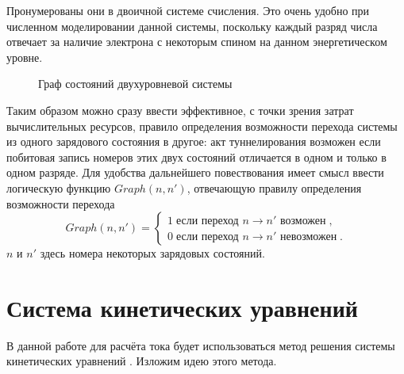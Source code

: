 \documentclass[12pt,a4paper]{report}
\begin{document}
Пронумерованы они в двоичной системе счисления. Это очень удобно при численном моделировании данной системы, поскольку каждый разряд числа отвечает за наличие электрона с некоторым спином на данном энергетическом уровне.

\begin{figure}[h]
	\caption{Граф состояний двухуровневой системы}
	\label{fig:level-graph1}
\end{figure}

Таким образом можно сразу ввести эффективное, с точки зрения затрат вычислительных ресурсов, правило определения возможности перехода системы из одного зарядового состояния в другое: акт туннелирования возможен если побитовая запись номеров этих двух состояний отличается в одном и только в одном разряде. Для удобства дальнейшего повествования имеет смысл ввести логическую функцию $Graph(n, n')$, отвечающую правилу определения возможности перехода
\begin{equation}\label{rule}
Graph(n, n') =  \left\{
  \begin{array}{c}
    1\;\mbox{если переход $n \to n'$ возможен}\;,\\
    0\;\mbox{если переход $n \to n'$ невозможен}\;.
  \end{array}
  \right.
\end{equation}
$n$ и $n'$ здесь номера некоторых зарядовых состояний. 
\section{Система кинетических уравнений}
В данной работе для расчёта тока будет использоваться метод решения системы кинетических уравнений \cite{kinetic}. Изложим идею этого метода.
\end{document}

